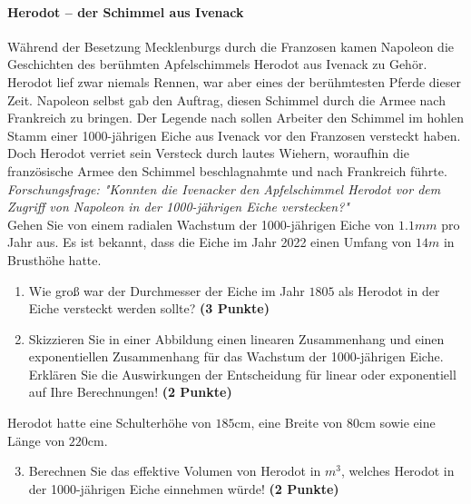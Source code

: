 \documentclass[a4paper, 9pt]{scrartcl}\usepackage[]{graphicx}\usepackage[]{xcolor}
\begin{document}
\paragraph{Herodot – der Schimmel aus Ivenack}

W{\"a}hrend der Besetzung Mecklenburgs durch die Franzosen kamen Napoleon die
Geschichten des ber{\"u}hmten Apfelschimmels Herodot aus Ivenack zu
Geh{\"o}r. Herodot lief zwar niemals Rennen, war aber eines der ber{\"u}hmtesten
Pferde dieser Zeit. Napoleon selbst gab den Auftrag, diesen
Schimmel durch die Armee nach Frankreich zu bringen. Der Legende nach
sollen Arbeiter den Schimmel im hohlen Stamm einer 1000-j{\"a}hrigen Eiche aus Ivenack vor
den Franzosen versteckt haben. Doch Herodot verriet sein Versteck durch
lautes Wiehern, woraufhin die franz{\"o}sische Armee den Schimmel
beschlagnahmte und nach Frankreich f{\"u}hrte. \\



\textit{Forschungsfrage: "Konnten die Ivenacker den Apfelschimmel Herodot
  vor dem Zugriff von Napoleon in der 1000-j{\"a}hrigen Eiche verstecken?"} \\

Gehen Sie von einem radialen Wachstum der 1000-j{\"a}hrigen Eiche von
$1.1mm$ pro Jahr aus. Es ist bekannt, dass die Eiche im
Jahr 2022 einen Umfang von $14m$ in Brusth{\"o}he hatte.

\begin{enumerate}
\item Wie gro{\ss} war der Durchmesser der Eiche im Jahr $1805$ als
  Herodot in der Eiche versteckt werden sollte?
  \textbf{(3 Punkte)}
\item Skizzieren Sie in einer Abbildung einen linearen Zusammenhang und einen
exponentiellen Zusammenhang f{\"u}r das Wachstum der 1000-j{\"a}hrigen Eiche. Erkl{\"a}ren Sie die
Auswirkungen der Entscheidung f{\"u}r linear oder exponentiell auf Ihre
Berechnungen! \textbf{(2 Punkte)}
\end{enumerate}
 
Herodot hatte eine Schulterh{\"o}he von $185$cm, eine Breite von
$80$cm sowie eine L{\"a}nge von  $220$cm.

\begin{enumerate}
  \setcounter{enumi}{2}
\item Berechnen Sie das effektive Volumen von Herodot in $m^3$, welches
  Herodot in der 1000-j{\"a}hrigen Eiche einnehmen w{\"u}rde! \textbf{(2 Punkte)}
\end{enumerate}
\end{document}
